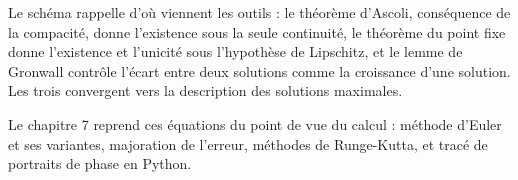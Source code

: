 \documentclass[a4paper,twoside]{report}
\begin{document}
\noindent Le schéma rappelle d'où viennent les outils : le théorème d'Ascoli, conséquence de la compacité, donne l'existence sous la seule continuité, le théorème du point fixe donne l'existence et l'unicité sous l'hypothèse de Lipschitz, et le lemme de Gronwall contrôle l'écart entre deux solutions comme la croissance d'une solution. Les trois convergent vers la description des solutions maximales.

\medskip
\noindent Le chapitre 7 reprend ces équations du point de vue du calcul : méthode d'Euler et ses variantes, majoration de l'erreur, méthodes de Runge-Kutta, et tracé de portraits de phase en Python.
\end{document}

